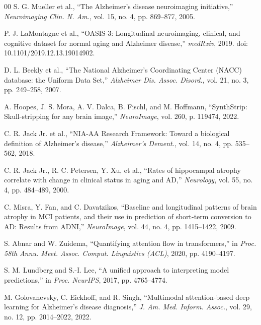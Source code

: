 \documentclass[conference]{IEEEtran}
\begin{document}
\begin{thebibliography}{00}
 S. G. Mueller et al., ``The Alzheimer's disease neuroimaging initiative,'' \textit{Neuroimaging Clin. N. Am.}, vol. 15, no. 4, pp. 869--877, 2005.

 P. J. LaMontagne et al., ``OASIS-3: Longitudinal neuroimaging, clinical, and cognitive dataset for normal aging and Alzheimer disease,'' \textit{medRxiv}, 2019. doi: 10.1101/2019.12.13.19014902.

 D. L. Beekly et al., ``The National Alzheimer's Coordinating Center (NACC) database: the Uniform Data Set,'' \textit{Alzheimer Dis. Assoc. Disord.}, vol. 21, no. 3, pp. 249--258, 2007.

 A. Hoopes, J. S. Mora, A. V. Dalca, B. Fischl, and M. Hoffmann, ``SynthStrip: Skull-stripping for any brain image,'' \textit{NeuroImage}, vol. 260, p. 119474, 2022.

 C. R. Jack Jr. et al., ``NIA-AA Research Framework: Toward a biological definition of Alzheimer's disease,'' \textit{Alzheimer's Dement.}, vol. 14, no. 4, pp. 535--562, 2018.

 C. R. Jack Jr., R. C. Petersen, Y. Xu, et al., ``Rates of hippocampal atrophy correlate with change in clinical status in aging and AD,'' \textit{Neurology}, vol. 55, no. 4, pp. 484--489, 2000.

 C. Misra, Y. Fan, and C. Davatzikos, ``Baseline and longitudinal patterns of brain atrophy in MCI patients, and their use in prediction of short-term conversion to AD: Results from ADNI,'' \textit{NeuroImage}, vol. 44, no. 4, pp. 1415--1422, 2009.

 S. Abnar and W. Zuidema, ``Quantifying attention flow in transformers,'' in \textit{Proc. 58th Annu. Meet. Assoc. Comput. Linguistics (ACL)}, 2020, pp. 4190--4197.

 S. M. Lundberg and S.-I. Lee, ``A unified approach to interpreting model predictions,'' in \textit{Proc. NeurIPS}, 2017, pp. 4765--4774.

 M. Golovanevsky, C. Eickhoff, and R. Singh, ``Multimodal attention-based deep learning for Alzheimer's disease diagnosis,'' \textit{J. Am. Med. Inform. Assoc.}, vol. 29, no. 12, pp. 2014--2022, 2022.

\end{thebibliography}
\end{document}
